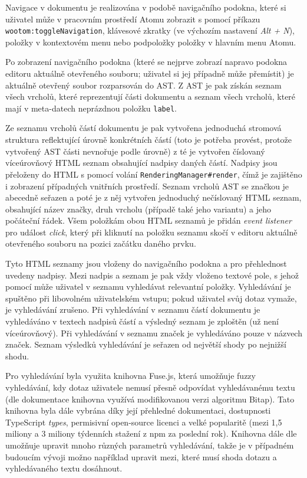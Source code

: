 Navigace v dokumentu je realizována v podobě navigačního podokna, které si uživatel může v pracovním prostředí Atomu
zobrazit s pomocí příkazu \texttt{wootom:toggleNavigation}, klávesové zkratky (ve výchozím nastavení \textit
{Alt + N}), položky  v kontextovém menu nebo podpoložky  položky
 v hlavním menu Atomu.

\begin{sloppypar}
Po zobrazení navigačního podokna (které se nejprve zobrazí napravo podokna editoru aktuálně otevřeného souboru; uživatel
si jej případně může přemístit) je aktuálně otevřený soubor rozparsován do AST. Z AST je pak získán seznam všech vrcholů,
které reprezentují části dokumentu a seznam všech vrcholů, které mají v meta-datech neprázdnou položku \texttt
{label}.
\end{sloppypar}

Ze seznamu vrcholů částí dokumentu je pak vytvořena jednoduchá stromová struktura reflektující úrovně konkrétních částí
(toto je potřeba provést, protože vytvořený AST části nevnořuje podle úrovně) z té je vytvořen číslovaný víceúrovňový
HTML seznam obsahující nadpisy daných částí. Nadpisy jsou přeloženy do HTML s pomocí volání \texttt
{RenderingManager#render}, čímž je zajištěno i zobrazení případných vnitřních prostředí. Seznam vrcholů AST se značkou
je abecedně seřazen a poté je z něj vytvořen jednoduchý nečíslovaný HTML seznam, obsahující název značky, druh vrcholu
(případě také jeho variantu) a jeho počáteční řádek. Všem položkám obou HTML seznamů je přidán \textit{event listener}
pro událost \textit{click}, který při kliknutí na položku seznamu skočí v editoru aktuálně otevřeného souboru na pozici
začátku daného prvku.

Tyto HTML seznamy jsou vloženy do navigačního podokna a pro přehlednost uvedeny nadpisy. Mezi nadpis a seznam je pak
vždy vloženo textové pole, s jehož pomocí může uživatel v seznamu vyhledávat relevantní položky. Vyhledávání je spuštěno
při libovolném uživatelském vstupu; pokud uživatel svůj dotaz vymaže, je vyhledávání zrušeno. Při vyhledávání v seznamu
částí dokumentu je vyhledáváno v textech nadpisů částí a výsledný seznam je zploštěn (už není víceúrovňový). Při
vyhledávání v seznamu značek je vyhledáváno pouze v názvech značek. Seznam výsledků vyhledávání je seřazen od největší
shody po nejnižší shodu.

Pro vyhledávání byla využita knihovna Fuse.js, která umožňuje fuzzy vyhledávání, kdy dotaz uživatele nemusí přesně
odpovídat vyhledávanému textu (dle dokumentace \cite{fuse-docs} knihovna využívá modifikovanou verzi algoritmu Bitap).
Tato knihovna byla dále vybrána díky její přehledné dokumentaci, dostupnosti TypeScript \textit{types}, permisivní
open-source licenci a velké popularitě (mezi 1,5 miliony a 3 miliony týdenních stažení z npm \cite{npm} za poslední
rok). Knihovna dále dle \cite{fuse-docs} umožňuje upravit mnoho různých parametrů vyhledávání, takže je v případném
budoucím vývoji možno například upravit mezi, které musí shoda dotazu a vyhledávaného textu dosáhnout.

